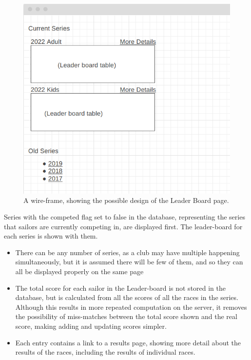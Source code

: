 \documentclass{l4proj}
\begin{document}
\begin{figure}[H]
    \centering
    \includegraphics[width=1\linewidth]{images/IndexWireframe.png} 

    \caption{A wire-frame, showing the possible design of the Leader Board page.
    }

    \label{fig:LeaderBoardWF}
\end{figure}


Series with the competed flag set to false in the database, representing the series that sailors are currently competing in, are displayed first. The leader-board for each series is shown with them.
\begin{itemize}
    \item
    There can be any number of series, as a club may have multiple happening simultaneously, but it is assumed there will be few of them, and so they can all be displayed properly on the same page
    \item
    The total score for each sailor in the Leader-board is not stored in the database, but is calculated from all the scores of all the races in the series. Although this results in more repeated computation on the server, it removes the possibility of miss-matches between the total score shown and the real score, making adding and updating scores simpler.
    \item
    Each entry contains a link to a results page, showing more detail about the results of the races, including the results of individual races.
\end{itemize}
    
\end{document}
